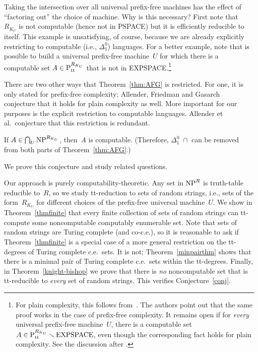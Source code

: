 \documentclass{LMCS}
\newcommand{\0}{\mathbf{0}}
\newcommand{\ce}{c.e.\ }
\newcommand{\<}{\langle}
\renewcommand{\>}{\rangle}
\begin{document}
Taking the intersection over all universal prefix-free machines has the
effect of ``factoring out'' the choice of machine. Why is this necessary?
First note that~$R_{K_U}$ is not computable (hence not in PSPACE) but it is
efficiently reducible to itself. This example is unsatisfying, of course,
because we are already explicitly restricting to computable (i.e.,
$\Delta^0_1$) languages. For a better example, note that is possible to build
a universal prefix-free machine~$U$ for which there is a computable set $A\in
\textup{P}_\text{tt}^{R_{K_U}}$ that is not in EXPSPACE.\footnote{For plain
complexity, this follows from~\cite[Theorem~12]{ABK:06}. The authors point
out that the same proof works in the case of prefix-free complexity. It
remains open if for \emph{every} universal prefix-free machine~$U$, there is
a computable set
$A\in\textup{P}_\text{tt}^{R_{K_U}}\smallsetminus\text{EXPSPACE}$, even
though the corresponding fact holds for plain complexity. See the discussion
after \cite[Theorem~16]{ABK:06}.}

There are two other ways that Theorem~\ref{thm:AFG} is restricted. For one,
it is only stated for prefix-free complexity; Allender, Friedman and
Gasarch~\cite{AFG} conjecture that it holds for plain complexity as well.
More important for our purposes is the explicit restriction to computable
languages. Allender et al.\ conjecture that this restriction is redundant.

\begin{conj}\label{conj}
If $A\in \bigcap_{U}\textup{NP}^{R_{K_U}}$, then~$A$ is computable.
(Therefore, $\Delta^0_1\;\cap$ can be removed from both parts of
Theorem~\ref{thm:AFG}.)
\end{conj}

\noindent We prove this conjecture and study related questions.

Our approach is purely computability-theoretic. Any set in $\textup{NP}^{R}$
is truth-table reducible to~$R$, so we study tt-reduction to sets of random
strings, i.e., sets of the form~$R_{K_U}$ for different choices of the
prefix-free universal machine~$U$. We show in Theorem~\ref{thmfinite} that
every finite collection of sets of random strings can tt-compute some
noncomputable computably enumerable set. Note that sets of random strings are
Turing complete (and co-c.e.), so it is reasonable to ask if
Theorem~\ref{thmfinite} is a special case of a more general restriction on
the tt-degrees of Turing complete \ce sets. It is not;
Theorem~\ref{minpairthm} shows that there is a minimal pair of Turing
complete \ce sets within the tt-degrees. Finally, in
Theorem~\ref{knight-bishop} we prove that there is \emph{no} noncomputable
set that is tt-reducible to \emph{every} set of random strings. This verifies
Conjecture~\ref{conj}.
\end{document}
